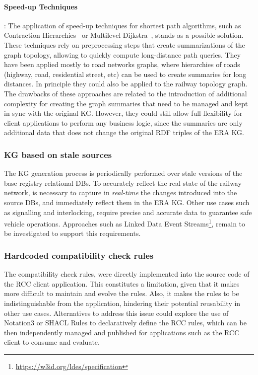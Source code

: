 \paragraph{Speed-up Techniques}: The application of speed-up techniques for shortest path algorithms,
such as Contraction Hierarchies~\cite{dibbelt2016}
or Multilevel Dijkstra~\cite{delling2017}, stands as a possible solution.
These techniques rely on preprocessing steps
that create summarizations of the graph topology,
allowing to quickly compute long-distance path queries.
They have been applied mostly to road networks graphs,
where hierarchies of roads (highway, road, residential street, etc)
can be used to create summaries for long distances.
In principle they could also be applied to the railway topology graph.
The drawbacks of these approaches are related to the introduction
of additional complexity for creating the graph summaries
that need to be managed and kept in sync with the original KG.
However, they could still allow full flexibility for client applications
to perform any business logic,
since the summaries are only additional data that does not change
the original RDF triples of the ERA KG.

\subsubsection{KG based on stale sources}
The KG generation process is periodically performed
over stale versions of the base registry relational DBs.
To accurately reflect the real state of the railway network,
is necessary to capture in \textit{real-time} the changes introduced into the source DBs,
and immediately reflect them in the ERA KG.
Other use cases such as signalling and interlocking,
require precise and accurate data to guarantee safe vehicle operations.
Approaches such as Linked Data Event Streams\footnote{\url{https://w3id.org/ldes/specification}},
remain to be investigated to support this requirements.

\subsubsection{Hardcoded compatibility check rules}
The compatibility check rules,
were directly implemented into the source code of the RCC client application.
This constitutes a limitation, given that it makes more difficult
to maintain and evolve the rules.
Also, it makes the rules to be indistinguishable from the application,
hindering their potential reusability in other use cases.
Alternatives to address this issue could explore
the use of Notation3 or SHACL Rules
to declaratively define the RCC rules,
which can be then independently managed
and published for applications such as the RCC client to consume and evaluate.